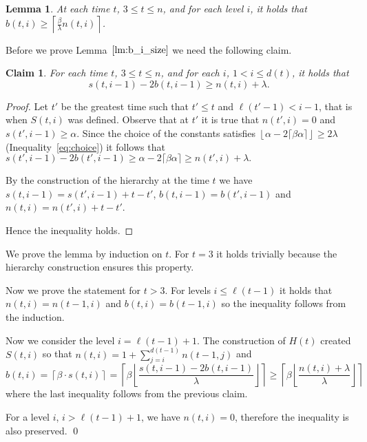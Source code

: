\documentclass{llncs}
\newtheorem{lemma}[definition]{Lemma}
\newtheorem{claim}[definition]{Claim}
\newenvironment{proofof}[1]{\noindent{\it Proof of #1. }} {{\qed}}
\newcommand{\hb}[2]{b\left(#1, #2\right)}
\newcommand{\hn}[2]{n\left(#1, #2\right)}
\newcommand{\hs}[2]{s\left(#1, #2\right)}
\newcommand{\hS}[2]{S\left(#1, #2\right)}
\newcommand{\hH}[1]{H\left(#1\right)}
\newcommand{\htz}{3}
\newcommand{\rl}[1]{\ell\left(#1\right)}
\begin{document}
\begin{lemma}
\label{lm:b_i_size}
At each time $t$, $\htz \leq t \leq n$, and for each level $i$, it holds that $\hb{t}{i} \geq \left\lceil \frac{\beta}{\lambda} \hn{t}{i} \right\rceil$.
\end{lemma}
Before we prove Lemma~$\ref{lm:b_i_size}$ we need the following claim.

\begin{claim}
For each time $t$, $\htz \leq t \leq n$, and for each $i$, $1 < i \leq d(t)$, it holds that
\[
	\hs{t}{i - 1} - 2\hb{t}{i - 1} \geq \hn{t}{i} + \lambda.
\]
\end{claim}
\begin{proof}
Let $t'$ be the greatest time such that $t' \leq t$ and $\rl{t' - 1} < i - 1$, that is when $\hS{t}{i}$ was defined.
Observe that at $t'$ it is true that $\hn{t'}{i} = 0$ and $\hs{t'}{i - 1} \geq \alpha$.
Since the choice of the constants satisfies $\left\lfloor \alpha - 2 \lceil\beta\alpha\rceil \right\rfloor \geq 2\lambda$ (Inequality~\eqref{eq:choice}) it follows that $\hs{t'}{i - 1} - 2\hb{t'}{i - 1} \geq \alpha - 2 \lceil\beta\alpha\rceil \geq \hn{t'}{i} + \lambda.$

By the construction of the hierarchy at the time $t$ we have $\hs{t}{i - 1} = \hs{t'}{i - 1} + t - t'$, $\hb{t}{i - 1} = \hb{t'}{i - 1}$ and $\hn{t}{i} = \hn{t'}{i} + t - t'$.

Hence the inequality holds.
\end{proof}

\begin{proofof}{Lemma~\ref{lm:b_i_size}}
We prove the lemma by induction on $t$.
For $t = \htz$ it holds trivially because the hierarchy construction ensures this property.

Now we prove the statement for $t > \htz$.
For levels $i \leq \rl{t - 1}$ it holds that $\hn{t}{i} = \hn{t - 1}{i}$ and $\hb{t}{i} = \hb{t - 1}{i}$ so the inequality follows from the induction.

Now we consider the level $i = \rl{t - 1} + 1$.
The construction of $\hH{t}$ created $\hS{t}{i}$ so that $\hn{t}{i} = 1 + \sum_{j = i}^{d(t - 1)} \hn{t - 1}{j}$ and
\[
	\hb{t}{i} = \left\lceil \beta \cdot \hs{t}{i} \right\rceil = \left\lceil \beta \left \lfloor \frac{\hs{t}{i - 1} - 2\hb{t}{i - 1}}{\lambda} \right \rfloor \right\rceil \geq \left\lceil \beta \left\lfloor \frac{\hn{t}{i} + \lambda}{\lambda} \right\rfloor \right\rceil
\]
where the last inequality follows from the previous claim.

For a level $i$, $i > \rl{t - 1} + 1$, we have $\hn{t}{i} = 0$, therefore the inequality is also preserved.
\end{proofof}
\end{document}
